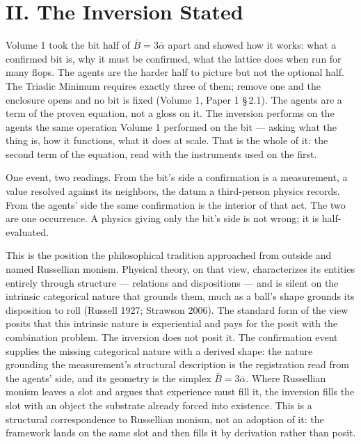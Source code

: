 \documentclass[11pt,oneside]{report}
\theoremstyle{definition}
\theoremstyle{remark}
\begin{document}
\section*{II. The Inversion Stated}

Volume 1 took the bit half of \ensuremath{\bar{B} = 3\bar{\alpha}} apart
and showed how it works: what a confirmed bit is, why it must be
confirmed, what the lattice does when run for many flops. The agents are
the harder half to picture but not the optional half. The Triadic
Minimum requires exactly three of them; remove one and the enclosure
opens and no bit is fixed (Volume 1, Paper 1 \S\,2.1). The agents are a
term of the proven equation, not a gloss on it. The inversion performs on
the agents the same operation Volume 1 performed on the bit --- asking
what the thing is, how it functions, what it does at scale. That is the
whole of it: the second term of the equation, read with the instruments
used on the first.

One event, two readings. From the bit's side a confirmation is a
measurement, a value resolved against its neighbors, the datum a
third-person physics records. From the agents' side the same confirmation
is the interior of that act. The two are one occurrence. A physics giving
only the bit's side is not wrong; it is half-evaluated.

This is the position the philosophical tradition approached from outside
and named Russellian monism. Physical theory, on that view, characterizes
its entities entirely through structure --- relations and dispositions
--- and is silent on the intrinsic categorical nature that grounds them,
much as a ball's shape grounds its disposition to roll (Russell 1927;
Strawson 2006). The standard form of the view posits that this intrinsic
nature is experiential and pays for the posit with the combination
problem. The inversion does not posit it. The confirmation event supplies
the missing categorical nature with a derived shape: the nature grounding
the measurement's structural description is the registration read from
the agents' side, and its geometry is the simplex \ensuremath{\bar{B} =
3\bar{\alpha}}. Where Russellian monism leaves a slot and argues that
experience must fill it, the inversion fills the slot with an object the
substrate already forced into existence. This is a structural
correspondence to Russellian monism, not an adoption of it: the framework
lands on the same slot and then fills it by derivation rather than posit.
\end{document}
